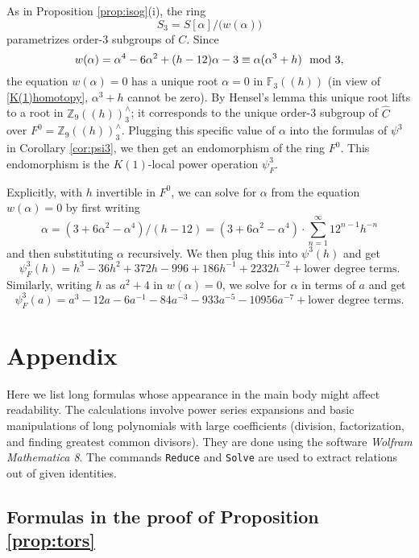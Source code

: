 \documentclass{gtpart}
\theoremstyle{definition}
\theoremstyle{remark}
\newcommand{\mb}[1]{\mathbb{#1}}
\newcommand{\BF}{{\mb F}}
\newcommand{\BZ}{{\mb Z}}
\newcommand{\HC}{\widehat{C}}
\newcommand{\md}{~~{\rm mod}~}
\newcommand{\A}{\alpha}
\newcommand{\p}{\psi^3}
\newcommand{\isog}[1]{Proposition \ref{prop:isog}\thinspace (#1)}
\begin{document}
As in \isog{i}, the ring 
\[
 S_3 = S[\A] \big/ \big( w(\A) \big) 
\]
parametrizes order-3 subgroups of $C$.  Since 
\[
 w(\A) = \A^4 - 6 \A^2 + (h - 12) \A - 3 \equiv \A (\A^3 + h) \md 3, 
\]
the equation $w(\A) = 0$ has a unique root $\A = 0$ in $\BF_3 (\!(h)\!)$ (in view of \eqref{K(1)homotopy}, $\A^3 + h$ cannot be zero).  
By Hensel's lemma this unique root lifts to a root in $\BZ_9 (\!(h)\!)_3^\wedge$; 
it corresponds to the unique order-3 subgroup of $\HC$ over $F^0 = \BZ_9 (\!(h)\!)_3^\wedge$.  
Plugging this specific value of $\A$ into the formulas of $\p$ in Corollary \ref{cor:psi3}, we then get an endomorphism of the ring $F^0$.  
This endomorphism is the $K(1)$-local power operation $\psi_F^3$.  

Explicitly, with $h$ invertible in $F^0$, we can solve for $\A$ from the equation $w(\A) = 0$ by first writing 
\[
 \A = (3 + 6 \A^2 - \A^4) / (h - 12) = (3 + 6 \A^2 - \A^4) \cdot \sum_{n = 1}^\infty 12^{n-1} h^{-n} 
\]
and then substituting $\A$ recursively.  We then plug this into $\p(h)$ and get 
\[
 \psi_F^3(h) = h^3 - 36 h^2 + 372 h - 996 + 186 h^{-1} + 2232 h^{-2} + \text{lower degree terms}.  
\]
Similarly, writing $h$ as $a^2 + 4$ in $w(\A) = 0$, we solve for $\A$ in terms of $a$ and get 
\[
 \psi_F^3(a) = a^3 - 12 a - 6 a^{-1} - 84 a^{-3} - 933 a^{-5} - 10956 a^{-7} + \text{lower degree terms}.  
\]


\appendix
\section{Appendix}

Here we list long formulas whose appearance in the main body might affect readability.  
The calculations involve power series expansions and basic manipulations of long polynomials with large coefficients 
(division, factorization, and finding greatest common divisors).  
They are done using the software {\em Wolfram Mathematica 8}.  
The commands \texttt{Reduce} and \texttt{Solve} are used to extract relations out of given identities.  


\subsection{Formulas in the proof of Proposition \ref{prop:tors}}
\label{apx:tors}
\end{document}
